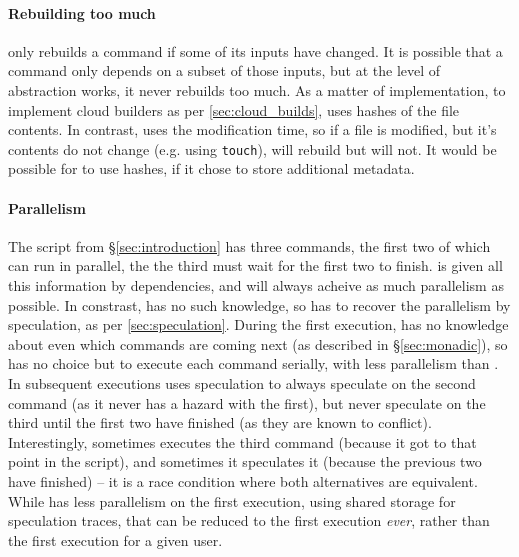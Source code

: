 \paragraph{Rebuilding too much} \Rattle only rebuilds a command if some of its inputs have changed. It is possible that a command only depends on a subset of those inputs, but at the level of abstraction \Rattle works, it never rebuilds too much. As a matter of implementation, to implement cloud builders as per \ref{sec:cloud_builds}, \Rattle uses hashes of the file contents. In contrast, \Make uses the modification time, so if a file is modified, but it's contents do not change (e.g. using \texttt{touch}), \Make will rebuild but \Rattle will not. It would be possible for \Make to use hashes, if it chose to store additional metadata.

\paragraph{Parallelism} The script from \S\ref{sec:introduction} has three commands, the first two of which can run in parallel, the the third must wait for the first two to finish. \Make is given all this information by dependencies, and will always acheive as much parallelism as possible. In constrast, \Rattle has no such knowledge, so has to recover the parallelism by speculation, as per \ref{sec:speculation}. During the first execution, \Rattle has no knowledge about even which commands are coming next (as described in \S\ref{sec:monadic}), so has no choice but to execute each command serially, with less parallelism than \Make. In subsequent executions \Rattle uses speculation to always speculate on the second command (as it never has a hazard with the first), but never speculate on the third until the first two have finished (as they are known to conflict). Interestingly, sometimes \Rattle executes the third command (because it got to that point in the script), and sometimes it speculates it (because the previous two have finished) -- it is a race condition where both alternatives are equivalent. While \Rattle has less parallelism on the first execution, using shared storage for speculation traces, that can be reduced to the first execution \emph{ever}, rather than the first execution for a given user.

